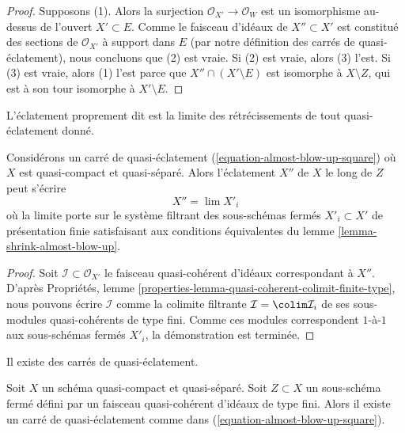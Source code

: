 \begin{proof}
Supposons (1). Alors la surjection $\mathcal{O}_{X'} \to \mathcal{O}_W$
est un isomorphisme au-dessus de l'ouvert $X' \subset E$. Comme le faisceau d'idéaux
de $X'' \subset X'$ est constitué des sections de $\mathcal{O}_{X'}$ à support dans $E$
(par notre définition des carrés de quasi-éclatement),
nous concluons que (2) est vraie. Si (2) est vraie, alors (3) l'est.
Si (3) est vraie, alors (1) l'est parce que $X'' \cap (X' \setminus E)$
est isomorphe à $X \setminus Z$, qui est à son tour isomorphe
à $X' \setminus E$.
\end{proof}

\noindent
L'éclatement proprement dit est la limite des rétrécissements de tout quasi-éclatement donné.

\begin{lemma}
\label{lemma-blow-up-limit-almost-blow-up}
Considérons un carré de quasi-éclatement (\ref{equation-almost-blow-up-square})
où $X$ est quasi-compact et quasi-séparé. Alors l'éclatement $X''$ de $X$
le long de $Z$ peut s'écrire
$$
X'' = \lim X'_i
$$
où la limite porte sur le système filtrant des sous-schémas fermés
$X'_i \subset X'$ de présentation finie satisfaisant aux conditions équivalentes
du lemme \ref{lemma-shrink-almost-blow-up}.
\end{lemma}

\begin{proof}
Soit $\mathcal{I} \subset \mathcal{O}_{X'}$ le faisceau quasi-cohérent
d'idéaux correspondant à $X''$. D'après
Propriétés, lemme \ref{properties-lemma-quasi-coherent-colimit-finite-type},
nous pouvons écrire $\mathcal{I}$ comme la colimite filtrante
$\mathcal{I} = \colim \mathcal{I}_i$ de ses sous-modules quasi-cohérents
de type fini. Comme ces modules correspondent
$1$-à-$1$ aux sous-schémas fermés $X'_i$, la démonstration est terminée.
\end{proof}

\noindent
Il existe des carrés de quasi-éclatement.

\begin{lemma}
\label{lemma-almost-blow-up-square}
Soit $X$ un schéma quasi-compact et quasi-séparé. Soit $Z \subset X$
un sous-schéma fermé défini par un faisceau quasi-cohérent d'idéaux
de type fini. Alors il existe un carré de quasi-éclatement comme dans
(\ref{equation-almost-blow-up-square}).
\end{lemma}

